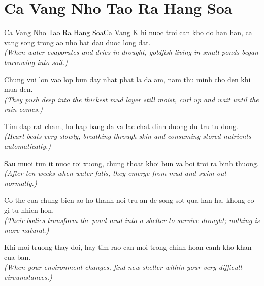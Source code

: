 \section{Ca Vang Nho Tao Ra Hang Soa}
\begin{truyen}{Ca Vang Nho Tao Ra Hang Soa}{Ca Vang}
K hi nuoc troi can kho do han han, ca vang song trong ao nho bat dau duoc long dat.\\
\textit{(When water evaporates and dries in drought, goldfish living in small ponds began burrowing into soil.)}

Chung vui lon vao lop bun day nhat phat la da am, nam thu minh cho den khi mua den.\\
\textit{(They push deep into the thickest mud layer still moist, curl up and wait until the rain comes.)}

Tim dap rat cham, ho hap bang da va lac chat dinh duong du tru tu dong.\\
\textit{(Heart beats very slowly, breathing through skin and consuming stored nutrients automatically.)}

Sau muoi tun it nuoc roi xuong, chung thoat khoi bun va boi troi ra binh thuong.\\
\textit{(After ten weeks when water falls, they emerge from mud and swim out normally.)}

Co the cua chung bien ao ho thanh noi tru an de song sot qua han ha, khong co gi tu nhien hon.\\
\textit{(Their bodies transform the pond mud into a shelter to survive drought; nothing is more natural.)}

\end{truyen}
\begin{baihoc}
  Khi moi truong thay doi, hay tim rao can moi trong chinh hoan canh kho khan cua ban.\\
  \textit{(When your environment changes, find new shelter within your very difficult circumstances.)}
\end{baihoc}

